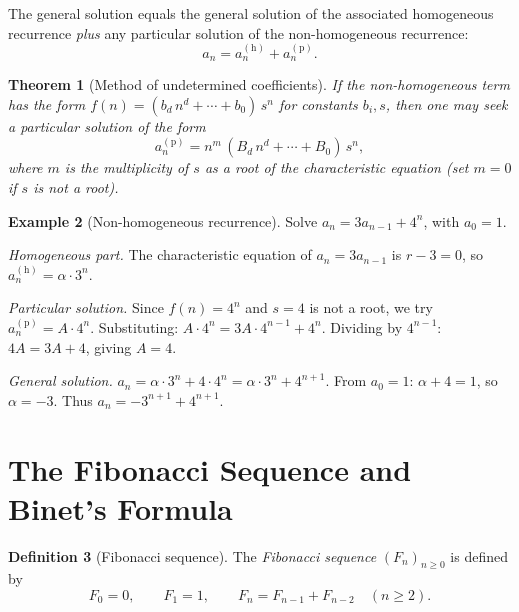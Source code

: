 \documentclass[12pt,a4paper,openany]{book}
\theoremstyle{definition}
\newtheorem{definition}{Definition}[chapter]
\newtheorem{example}[definition]{Example}
\theoremstyle{plain}
\newtheorem{theorem}[definition]{Theorem}
\theoremstyle{remark}
\begin{document}
The general solution equals the general solution of the associated
homogeneous recurrence \emph{plus} any particular solution of the
non-homogeneous recurrence:
\begin{equation}\label{eq:nonhom-structure}
   a_n = a_n^{(\mathrm{h})} + a_n^{(\mathrm{p})}.
\end{equation}

\begin{theorem}[Method of undetermined coefficients]\label{thm:undetermined-coeff}
If the non-homogeneous term has the form $f(n) = (b_d\, n^d + \cdots + b_0)\, s^n$
for constants $b_i, s$, then one may seek a particular solution of the form
\[
   a_n^{(\mathrm{p})}
   = n^m\, (B_d\, n^d + \cdots + B_0)\, s^n,
\]
where $m$ is the multiplicity of $s$ as a root of the characteristic
equation (set $m = 0$ if $s$ is not a root).
\end{theorem}

\begin{example}[Non-homogeneous recurrence]\label{ex:nonhom}
Solve $a_n = 3a_{n-1} + 4^n$, with $a_0 = 1$.

\emph{Homogeneous part.}  The characteristic equation of $a_n = 3a_{n-1}$
is $r - 3 = 0$, so $a_n^{(\mathrm{h})} = \alpha \cdot 3^n$.

\emph{Particular solution.}  Since $f(n) = 4^n$ and $s = 4$ is not a
root, we try $a_n^{(\mathrm{p})} = A \cdot 4^n$.  Substituting:
$A \cdot 4^n = 3A \cdot 4^{n-1} + 4^n$.  Dividing by $4^{n-1}$:
$4A = 3A + 4$, giving $A = 4$.

\emph{General solution.}  $a_n = \alpha \cdot 3^n + 4 \cdot 4^n
= \alpha \cdot 3^n + 4^{n+1}$.
From $a_0 = 1$: $\alpha + 4 = 1$, so $\alpha = -3$.
Thus $a_n = -3^{n+1} + 4^{n+1}$.
\end{example}

\section{The Fibonacci Sequence and Binet's Formula}\label{sec:fibonacci}

\begin{definition}[Fibonacci sequence]\label{def:fibonacci}
The \emph{Fibonacci sequence} $(F_n)_{n \ge 0}$ is defined by
\[
   F_0 = 0, \qquad F_1 = 1, \qquad F_n = F_{n-1} + F_{n-2}
   \quad (n \ge 2).
\]
\end{definition}
\end{document}
